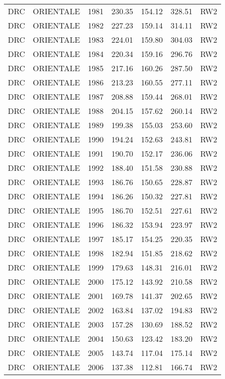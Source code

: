 \begin{longtable}{lllrrrl}
  DRC & ORIENTALE & 1981 & 230.35 & 154.12 & 328.51 & RW2 \\ 
  DRC & ORIENTALE & 1982 & 227.23 & 159.14 & 314.11 & RW2 \\ 
  DRC & ORIENTALE & 1983 & 224.01 & 159.80 & 304.03 & RW2 \\ 
  DRC & ORIENTALE & 1984 & 220.34 & 159.16 & 296.76 & RW2 \\ 
  DRC & ORIENTALE & 1985 & 217.16 & 160.26 & 287.50 & RW2 \\ 
  DRC & ORIENTALE & 1986 & 213.23 & 160.55 & 277.11 & RW2 \\ 
  DRC & ORIENTALE & 1987 & 208.88 & 159.44 & 268.01 & RW2 \\ 
  DRC & ORIENTALE & 1988 & 204.15 & 157.62 & 260.14 & RW2 \\ 
  DRC & ORIENTALE & 1989 & 199.38 & 155.03 & 253.60 & RW2 \\ 
  DRC & ORIENTALE & 1990 & 194.24 & 152.63 & 243.81 & RW2 \\ 
  DRC & ORIENTALE & 1991 & 190.70 & 152.17 & 236.06 & RW2 \\ 
  DRC & ORIENTALE & 1992 & 188.40 & 151.58 & 230.88 & RW2 \\ 
  DRC & ORIENTALE & 1993 & 186.76 & 150.65 & 228.87 & RW2 \\ 
  DRC & ORIENTALE & 1994 & 186.26 & 150.32 & 227.81 & RW2 \\ 
  DRC & ORIENTALE & 1995 & 186.70 & 152.51 & 227.61 & RW2 \\ 
  DRC & ORIENTALE & 1996 & 186.32 & 153.94 & 223.97 & RW2 \\ 
  DRC & ORIENTALE & 1997 & 185.17 & 154.25 & 220.35 & RW2 \\ 
  DRC & ORIENTALE & 1998 & 182.94 & 151.85 & 218.62 & RW2 \\ 
  DRC & ORIENTALE & 1999 & 179.63 & 148.31 & 216.01 & RW2 \\ 
  DRC & ORIENTALE & 2000 & 175.12 & 143.92 & 210.58 & RW2 \\ 
  DRC & ORIENTALE & 2001 & 169.78 & 141.37 & 202.65 & RW2 \\ 
  DRC & ORIENTALE & 2002 & 163.84 & 137.02 & 194.83 & RW2 \\ 
  DRC & ORIENTALE & 2003 & 157.28 & 130.69 & 188.52 & RW2 \\ 
  DRC & ORIENTALE & 2004 & 150.63 & 123.42 & 183.20 & RW2 \\ 
  DRC & ORIENTALE & 2005 & 143.74 & 117.04 & 175.14 & RW2 \\ 
  DRC & ORIENTALE & 2006 & 137.38 & 112.81 & 166.74 & RW2 \\ 

\end{longtable}
